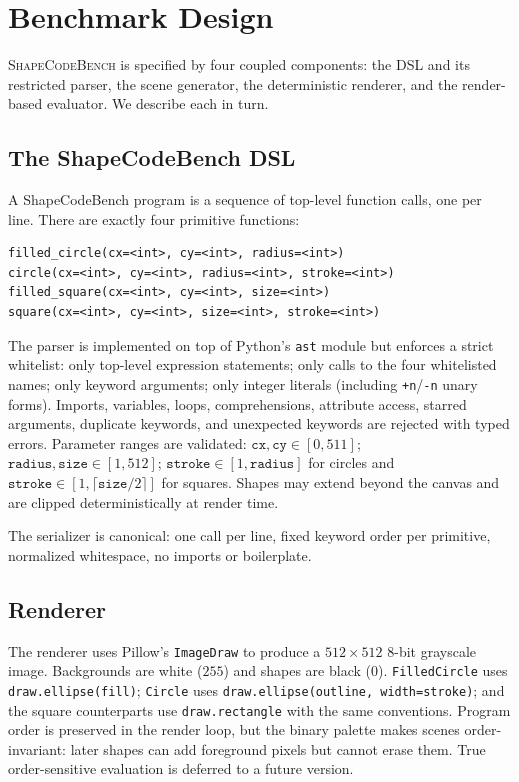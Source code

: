 \section{Benchmark Design}
\label{sec:benchmark}

\textsc{ShapeCodeBench} is specified by four coupled components: the DSL and its
restricted parser, the scene generator, the deterministic renderer, and the
render-based evaluator. We describe each in turn.

\subsection{The ShapeCodeBench DSL}
\label{sec:dsl}

A ShapeCodeBench program is a sequence of top-level function calls, one per line.
There are exactly four primitive functions:

\begin{lstlisting}
filled_circle(cx=<int>, cy=<int>, radius=<int>)
circle(cx=<int>, cy=<int>, radius=<int>, stroke=<int>)
filled_square(cx=<int>, cy=<int>, size=<int>)
square(cx=<int>, cy=<int>, size=<int>, stroke=<int>)
\end{lstlisting}

The parser is implemented on top of Python's \texttt{ast} module but enforces a
strict whitelist: only top-level expression statements; only calls to the four
whitelisted names; only keyword arguments; only integer literals (including
\texttt{+n}/\texttt{-n} unary forms). Imports, variables, loops, comprehensions,
attribute access, starred arguments, duplicate keywords, and unexpected keywords
are rejected with typed errors. Parameter ranges are validated:
$\texttt{cx},\texttt{cy} \in [0, 511]$; $\texttt{radius},\texttt{size} \in [1, 512]$;
$\texttt{stroke} \in [1, \texttt{radius}]$ for circles and
$\texttt{stroke} \in [1, \lceil \texttt{size}/2 \rceil]$ for squares. Shapes may
extend beyond the canvas and are clipped deterministically at render time.

The serializer is canonical: one call per line, fixed keyword order per
primitive, normalized whitespace, no imports or boilerplate.

\subsection{Renderer}
\label{sec:renderer}

The renderer uses Pillow's \texttt{ImageDraw} to produce a $512 \times 512$
8-bit grayscale image. Backgrounds are white ($255$) and shapes are black ($0$).
\texttt{FilledCircle} uses \texttt{draw.ellipse(fill)}; \texttt{Circle} uses
\texttt{draw.ellipse(outline, width=stroke)}; and the square counterparts use
\texttt{draw.rectangle} with the same conventions. Program order is preserved
in the render loop, but the binary palette makes scenes order-invariant: later
shapes can add foreground pixels but cannot erase them. True order-sensitive
evaluation is deferred to a future version.

